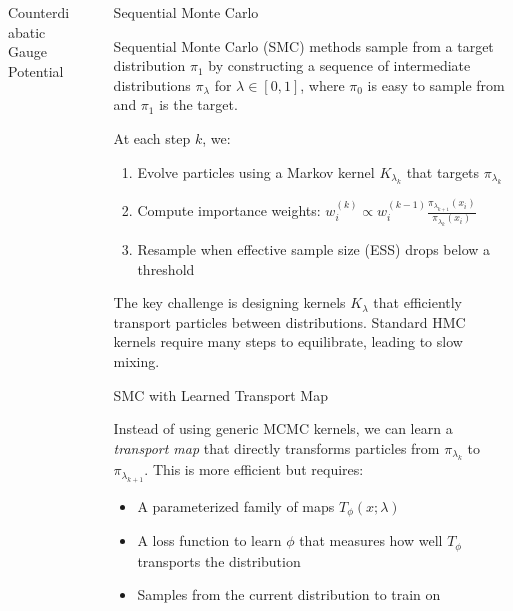 \documentclass[final]{beamer}
\newlength{\sepwidth}
\newlength{\colwidth}
\newcommand{\separatorcolumn}{\begin{column}{\sepwidth}\end{column}}
\begin{document}
\begin{frame}[t]
\begin{columns}[t]
\begin{column}{\colwidth}
\begin{block}{Counterdiabatic Gauge Potential}
  \end{block}

  
  
  
\end{column}

\separatorcolumn

\begin{column}{\colwidth}

\begin{block}{Sequential Monte Carlo}

Sequential Monte Carlo (SMC) methods sample from a target distribution $\pi_1$ by constructing a sequence of intermediate distributions $\pi_{\lambda}$ for $\lambda \in [0,1]$, where $\pi_0$ is easy to sample from and $\pi_1$ is the target.

At each step $k$, we:
\begin{enumerate}
\item Evolve particles using a Markov kernel $K_{\lambda_k}$ that targets $\pi_{\lambda_k}$
\item Compute importance weights: $w_i^{(k)} \propto w_i^{(k-1)} \frac{\pi_{\lambda_{k+1}}(x_i)}{\pi_{\lambda_k}(x_i)}$
\item Resample when effective sample size (ESS) drops below a threshold
\end{enumerate}

The key challenge is designing kernels $K_\lambda$ that efficiently transport particles between distributions. Standard HMC kernels require many steps to equilibrate, leading to slow mixing.

\begin{center}
\end{center}

  \end{block}

\begin{block}{SMC with Learned Transport Map}

Instead of using generic MCMC kernels, we can learn a \emph{transport map} that directly transforms particles from $\pi_{\lambda_k}$ to $\pi_{\lambda_{k+1}}$. This is more efficient but requires:
\begin{itemize}
\item A parameterized family of maps $T_\phi(x; \lambda)$
\item A loss function to learn $\phi$ that measures how well $T_\phi$ transports the distribution
\item Samples from the current distribution to train on
\end{itemize}


\end{block}
\end{column}
\end{columns}
\end{frame}
\end{document}
